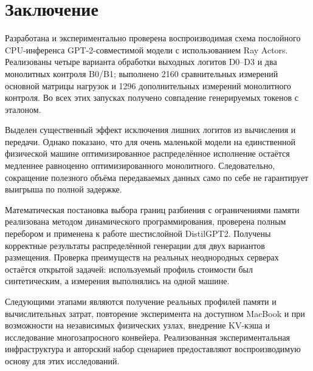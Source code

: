 \section{Заключение}

Разработана и экспериментально проверена воспроизводимая схема послойного CPU-инференса GPT-2-совместимой модели с использованием Ray Actors. Реализованы четыре варианта обработки выходных логитов D0--D3 и два монолитных контроля B0/B1; выполнено 2160 сравнительных измерений основной матрицы нагрузок и 1296 дополнительных измерений монолитного контроля. Во всех этих запусках получено совпадение генерируемых токенов с эталоном.

Выделен существенный эффект исключения лишних логитов из вычисления и передачи. Однако показано, что для очень маленькой модели на единственной физической машине оптимизированное распределённое исполнение остаётся медленнее равноценно оптимизированного монолитного. Следовательно, сокращение полезного объёма передаваемых данных само по себе не гарантирует выигрыша по полной задержке.

Математическая постановка выбора границ разбиения с ограничениями памяти реализована методом динамического программирования, проверена полным перебором и применена к работе шестислойной DistilGPT2. Получены корректные результаты распределённой генерации для двух вариантов размещения. Проверка преимуществ на реальных неоднородных серверах остаётся открытой задачей: используемый профиль стоимости был синтетическим, а измерения выполнялись на одной машине.

Следующими этапами являются получение реальных профилей памяти и вычислительных затрат, повторение эксперимента на доступном MacBook и при возможности на независимых физических узлах, внедрение KV-кэша и исследование многозапросного конвейера. Реализованная экспериментальная инфраструктура и авторский набор сценариев предоставляют воспроизводимую основу для этих исследований.

